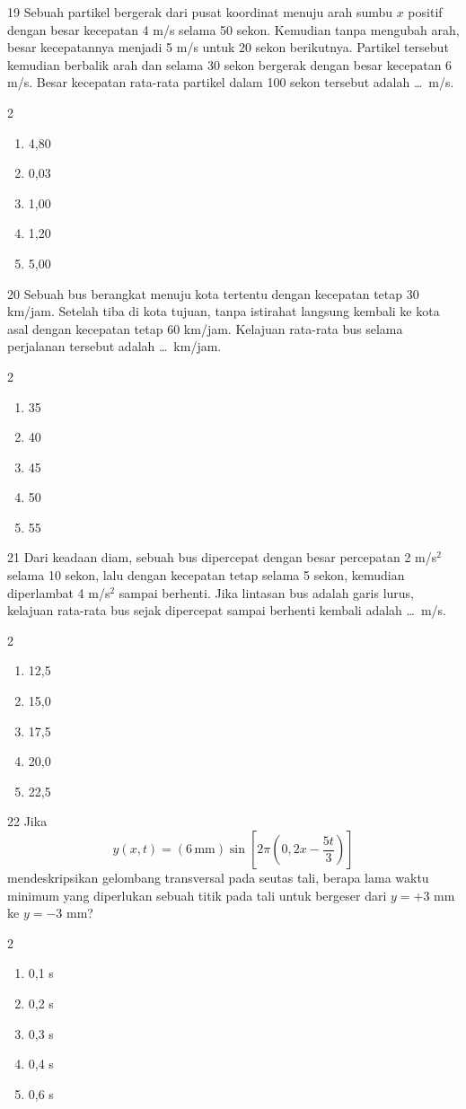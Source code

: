 \documentclass[11pt]{article}
\newenvironment{pilB}{%
  \par\smallskip\begin{multicols}{2}
  \begin{enumerate}[label=(\Alph*),leftmargin=*,itemsep=1pt,topsep=3pt]}%
  {\end{enumerate}\end{multicols}}
\begin{document}
\begin{soal}{19}
Sebuah partikel bergerak dari pusat koordinat menuju arah sumbu $x$
positif dengan besar kecepatan 4 m/s selama 50 sekon. Kemudian tanpa
mengubah arah, besar kecepatannya menjadi 5 m/s untuk 20 sekon
berikutnya. Partikel tersebut kemudian berbalik arah dan selama 30 sekon
bergerak dengan besar kecepatan 6 m/s. Besar kecepatan rata-rata
partikel dalam 100 sekon tersebut adalah \ldots\ m/s.
\begin{pilB}
  \item 4,80 \item 0,03 \item 1,00 \item 1,20 \item 5,00
\end{pilB}
\end{soal}

\begin{soal}{20}
Sebuah bus berangkat menuju kota tertentu dengan kecepatan tetap
30 km/jam. Setelah tiba di kota tujuan, tanpa istirahat langsung kembali
ke kota asal dengan kecepatan tetap 60 km/jam. Kelajuan rata-rata bus
selama perjalanan tersebut adalah \ldots\ km/jam.
\begin{pilB}
  \item 35 \item 40 \item 45 \item 50 \item 55
\end{pilB}
\end{soal}

\begin{soal}{21}
Dari keadaan diam, sebuah bus dipercepat dengan besar percepatan
2 m/s$^2$ selama 10 sekon, lalu dengan kecepatan tetap selama 5 sekon,
kemudian diperlambat 4 m/s$^2$ sampai berhenti. Jika lintasan bus
adalah garis lurus, kelajuan rata-rata bus sejak dipercepat sampai
berhenti kembali adalah \ldots\ m/s.
\begin{pilB}
  \item 12,5 \item 15,0 \item 17,5 \item 20,0 \item 22,5
\end{pilB}
\end{soal}

\begin{soal}{22}
Jika
\[
  y(x,t) = (6\,\text{mm})\sin\!\left[2\pi\!\left(0{,}2x-\frac{5t}{3}\right)\right]
\]
mendeskripsikan gelombang transversal pada seutas tali, berapa lama
waktu minimum yang diperlukan sebuah titik pada tali untuk bergeser dari
$y=+3$ mm ke $y=-3$ mm?
\begin{pilB}
  \item 0,1 s \item 0,2 s \item 0,3 s \item 0,4 s \item 0,6 s
\end{pilB}
\end{soal}
\end{document}
